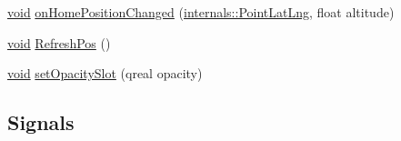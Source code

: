 \begin{DoxyCompactItemize}
\hyperlink{group___u_a_v_objects_plugin_ga444cf2ff3f0ecbe028adce838d373f5c}{void} \hyperlink{group___o_p_map_widget_gaacddad340f4910d2ddbc811183adb83c}{on\-Home\-Position\-Changed} (\hyperlink{structinternals_1_1_point_lat_lng}{internals\-::\-Point\-Lat\-Lng}, float altitude)
\item 
\hyperlink{group___u_a_v_objects_plugin_ga444cf2ff3f0ecbe028adce838d373f5c}{void} \hyperlink{group___o_p_map_widget_ga0fa8c77130a9df8c2057ea0078606e0f}{\-Refresh\-Pos} ()
\item 
\hyperlink{group___u_a_v_objects_plugin_ga444cf2ff3f0ecbe028adce838d373f5c}{void} \hyperlink{group___o_p_map_widget_ga31fd5de287142c02d4bd478b4aacdf52}{set\-Opacity\-Slot} (qreal opacity)
\end{DoxyCompactItemize}
\subsection*{\-Signals}
